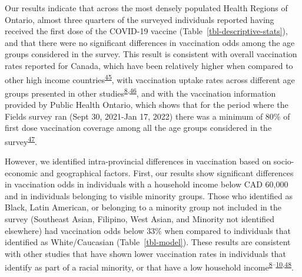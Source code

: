 \documentclass[
  letterpaper,
  DIV=11,
  numbers=noendperiod]{scrartcl}
\begin{document}
Our results indicate that across the most densely populated Health
Regions of Ontario, almost three quarters of the surveyed individuals
reported having received the first dose of the COVID-19 vaccine
(Table~\ref{tbl-descriptive-stats}), and that there were no significant
differences in vaccination odds among the age groups considered in the
survey. This result is consistent with overall vaccination rates
reported for Canada, which have been relatively higher when compared to
other high income
countries\textsuperscript{\protect\hyperlink{ref-dube2022}{45}}, with
vaccination uptake rates across different age groups presented in other
studies\textsuperscript{\protect\hyperlink{ref-guay2022}{8},\protect\hyperlink{ref-macdonald2021}{46}},
and with the vaccination information provided by Public Health Ontario,
which shows that for the period where the Fields survey ran (Sept 30,
2021-Jan 17, 2022) there was a minimum of 80\% of first dose vaccination
coverage among all the age groups considered in the
survey\textsuperscript{\protect\hyperlink{ref-ontario-covid}{47}}.

However, we identified intra-provincial differences in vaccination based
on socio-economic and geographical factors. First, our results show
significant differences in vaccination odds in individuals with a
household income below CAD 60,000 and in individuals belonging to
visible minority groups. Those who identified as Black, Latin American,
or belonging to a minority group not included in the survey (Southeast
Asian, Filipino, West Asian, and Minority not identified elsewhere) had
vaccination odds below 33\% when compared to individuals that identified
as White/Caucasian (Table~\ref{tbl-model}). These results are consistent
with other studies that have shown lower vaccination rates in
individuals that identify as part of a racial minority, or that have a
low household
income\textsuperscript{\protect\hyperlink{ref-guay2022}{8}--\protect\hyperlink{ref-hussain2022}{10},\protect\hyperlink{ref-carter2022}{48}}.
\end{document}
